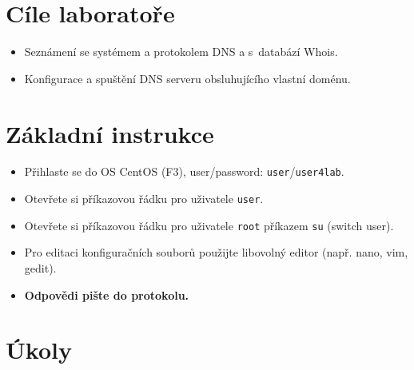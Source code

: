 \section*{Cíle laboratoře}
\begin{itemize}
  \item Seznámení se systémem a protokolem DNS a s~databází Whois.
  \item Konfigurace a spuštění DNS serveru obsluhujícího vlastní doménu.
\end{itemize}

\section*{Základní instrukce}
\begin{itemize}
  \item Přihlaste se do OS CentOS (F3), user/password: {\tt user}/{\tt user4lab}.
  \item Otevřete si příkazovou řádku pro uživatele {\tt user}.
  \item Otevřete si příkazovou řádku pro uživatele {\tt root} příkazem {\tt su}
    (switch user).
  \item Pro editaci konfiguračních souborů použijte libovolný editor (např.
    nano, vim, gedit).
  \item {\bf Odpovědi pište do protokolu.}
\end{itemize}

\section*{Úkoly}

